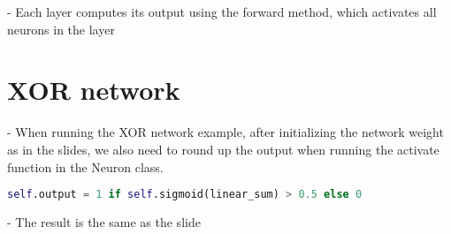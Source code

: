 \documentclass{article}
\begin{document}
- Each layer computes its output using the forward method, which activates all neurons in the layer

\section{XOR network}
- When running the XOR network example, after initializing the network weight as in the slides, we also need to round up the output when running the activate function in the Neuron class.

\begin{lstlisting}[language=Python]
    self.output = 1 if self.sigmoid(linear_sum) > 0.5 else 0
\end{lstlisting}

- The result is the same as the slide
\end{document}

